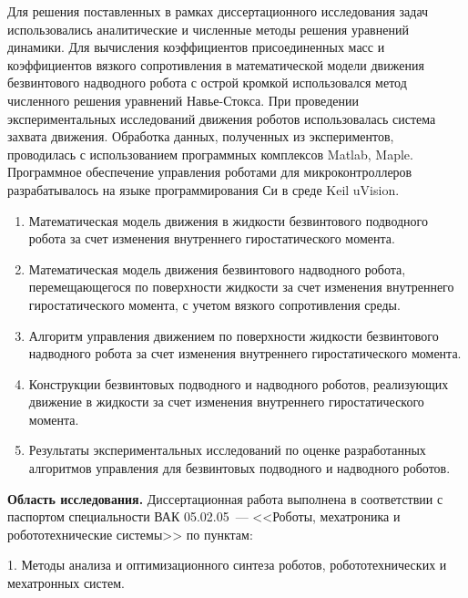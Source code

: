 {\methods} Для решения поставленных в рамках диссертационного исследования задач использовались аналитические и численные методы решения уравнений динамики. Для вычисления коэффициентов присоединенных масс и коэффициентов вязкого сопротивления в математической модели движения безвинтового надводного робота с острой кромкой использовался метод численного решения уравнений Навье-Стокса. При проведении экспериментальных исследований движения роботов использовалась система захвата движения. Обработка данных, полученных из экспериментов, проводилась с использованием программных комплексов Matlab, Maple. Программное обеспечение управления роботами для микроконтроллеров разрабатывалось на языке программирования Си в среде Keil uVision.

{}
\begin{enumerate}
  \item Математическая модель движения в жидкости безвинтового подводного робота за счет изменения внутреннего гиростатического момента.
  \item Математическая модель движения безвинтового надводного робота, перемещающегося по поверхности жидкости за счет изменения внутреннего гиростатического момента, с учетом вязкого сопротивления среды.
  \item Алгоритм управления движением по поверхности жидкости безвинтового надводного робота за счет изменения внутреннего гиростатического момента.
  \item Конструкции безвинтовых подводного и надводного роботов, реализующих движение в жидкости за счет изменения внутреннего гиростатического момента.
  \item Результаты экспериментальных исследований по оценке разработанных алгоритмов управления для безвинтовых подводного и надводного роботов.
  
\end{enumerate}

\textbf{{Область исследования}.} Диссертационная работа выполнена в соответствии с паспортом специальности ВАК 05.02.05~--- <<Роботы, мехатроника и робототехнические системы>> по пунктам: 

1. Методы анализа и оптимизационного синтеза роботов, робототехнических и мехатронных систем. 

